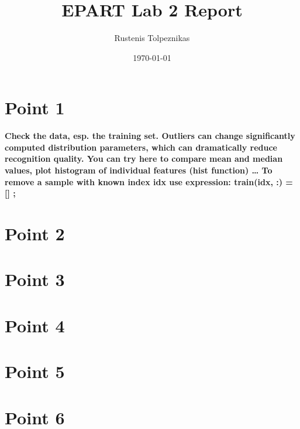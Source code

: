 \documentclass[a4paper,12pt]{article}
\title{EPART Lab 2 Report}
\author{Rustenis Tolpeznikas}
\date{\today}
\begin{document}
\maketitle
\newpage

\section{Point 1}

\textbf{Check the data, esp. the training set. Outliers can change significantly computed distribution parameters,
which can dramatically reduce recognition quality. You can try here to compare mean and median values,
plot histogram of individual features (hist function) …
To remove a sample with known index idx use expression:
train(idx, :) = [] ;}

\section{Point 2}
\section{Point 3}
\section{Point 4}
\section{Point 5}
\section{Point 6}
\end{document}
